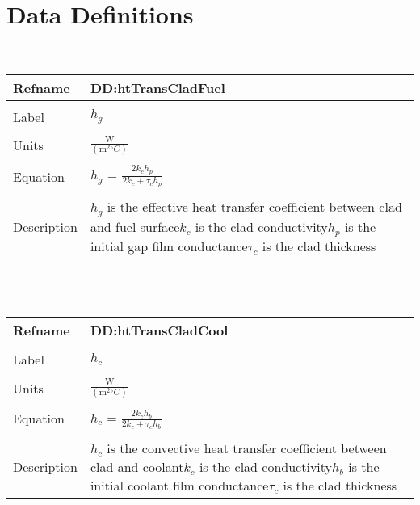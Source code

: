 \documentclass[12pt]{article}
\begin{document}
\section{Data Definitions}
\label{Sec:DD}
~\newline
\noindent \begin{minipage}{\textwidth}
\begin{tabular}{p{} p{}}
\toprule \textbf{Refname} & \textbf{DD:htTransCladFuel}
\label{DD:htTransCladFuel}
\\ \midrule \\
Label & $h_{g}$
\\ \midrule \\
Units & $\frac{\text{W}}{(\text{m}^{2}{}^{\circ}C)}$
\\ \midrule \\
Equation & $h_{g}$ = $\frac{2k_{c}h_{p}}{2k_{c}+\tau{}_{c}h_{p}}$
\\ \midrule \\
Description & $h_{g}$ is the effective heat transfer coefficient between clad and fuel surface\newline$k_{c}$ is the clad conductivity\newline$h_{p}$ is the initial gap film conductance\newline$\tau{}_{c}$ is the clad thickness
\\ \bottomrule \end{tabular}
\end{minipage}\\
~\newline
\noindent \begin{minipage}{\textwidth}
\begin{tabular}{p{} p{}}
\toprule \textbf{Refname} & \textbf{DD:htTransCladCool}
\label{DD:htTransCladCool}
\\ \midrule \\
Label & $h_{c}$
\\ \midrule \\
Units & $\frac{\text{W}}{(\text{m}^{2}{}^{\circ}C)}$
\\ \midrule \\
Equation & $h_{c}$ = $\frac{2k_{c}h_{b}}{2k_{c}+\tau{}_{c}h_{b}}$
\\ \midrule \\
Description & $h_{c}$ is the convective heat transfer coefficient between clad and coolant\newline$k_{c}$ is the clad conductivity\newline$h_{b}$ is the initial coolant film conductance\newline$\tau{}_{c}$ is the clad thickness
\\ \bottomrule \end{tabular}
\end{minipage}\\
\end{document}
